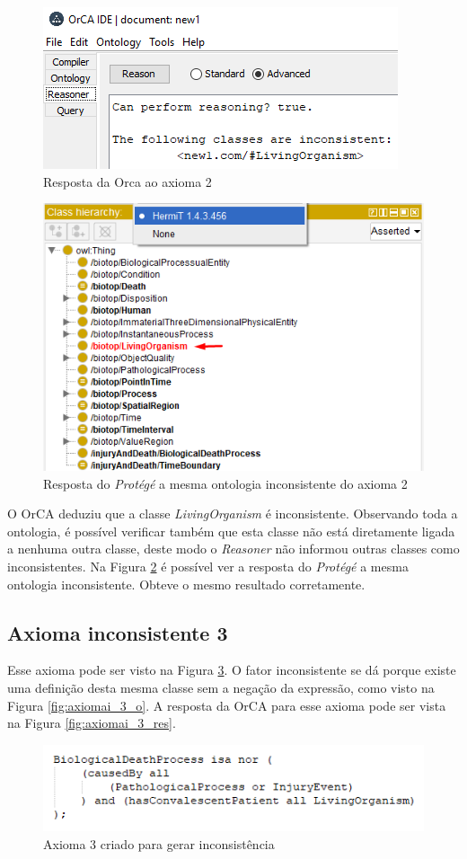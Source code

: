 \documentclass{bcc}
\begin{document}
\begin{figure}[H]
\centering
\includegraphics[width=.5\textwidth]{Figuras/axiomai_2_res.png}
\caption{Resposta da Orca ao axioma 2} 
\label{fig:axiomai_2_res}
\end{figure}

\begin{figure}[H]
\centering
\includegraphics[width=.6\textwidth]{Figuras/axiomai_2_protege.png}
\caption{Resposta do \textit{Protégé} a mesma ontologia inconsistente do axioma 2} 
\label{fig:axiomai_2_protege}
\end{figure}

O OrCA deduziu que a classe \textit{LivingOrganism} é inconsistente. Observando toda a ontologia, é possível verificar também que esta classe não está diretamente ligada a nenhuma outra classe, deste modo o \textit{Reasoner} não informou outras classes como inconsistentes. Na Figura \ref{fig:axiomai_2_protege} é possível ver a resposta do \textit{Protégé} a mesma ontologia inconsistente. Obteve o mesmo resultado corretamente.

\subsection{Axioma inconsistente 3}
Esse axioma pode ser visto na Figura \ref{fig:axiomai_3}. O fator inconsistente se dá porque existe uma definição desta mesma classe sem a negação da expressão, como visto na Figura \ref{fig:axiomai_3_o}. A resposta da OrCA para esse axioma pode ser vista na Figura \ref{fig:axiomai_3_res}.

\begin{figure}[H]
\centering
\includegraphics[width=.6\textwidth]{Figuras/axiomai_3.png}
\caption{Axioma 3 criado para gerar inconsistência} 
\label{fig:axiomai_3}
\end{figure}
\end{document}
